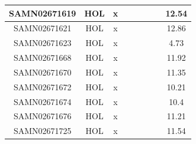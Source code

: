 \documentclass[../main.tex]{subfiles}
\begin{document}
\begin{flushleft}
\begin{footnotesize}
\begin{longtable}{|c|c|c|c|c|c|c|}
    \hline
    SAMN02671619  & HOL   & x                                                            & ~          & ~                                                                           & ~                                                                 & 12.54     \\ 
    \hline
    SAMN02671621  & HOL   & x                                                            & ~          & ~                                                                           & ~                                                                 & 12.86     \\ 
    \hline
    SAMN02671623  & HOL   & x                                                            & ~          & ~                                                                           & ~                                                                 & 4.73      \\ 
    \hline
    SAMN02671668  & HOL   & x                                                            & ~          & ~                                                                           & ~                                                                 & 11.92     \\ 
    \hline
    SAMN02671670  & HOL   & x                                                            & ~          & ~                                                                           & ~                                                                 & 11.35     \\ 
    \hline
    SAMN02671672  & HOL   & x                                                            & ~          & ~                                                                           & ~                                                                 & 10.21     \\ 
    \hline
    SAMN02671674  & HOL   & x                                                            & ~          & ~                                                                           & ~                                                                 & 10.4      \\ 
    \hline
    SAMN02671676  & HOL   & x                                                            & ~          & ~                                                                           & ~                                                                 & 11.21     \\ 
    \hline
    SAMN02671725  & HOL   & x                                                            & ~          & ~                                                                           & ~                                                                 & 11.54     \\ 

\end{longtable}
\end{footnotesize}
\end{flushleft}
\end{document}
